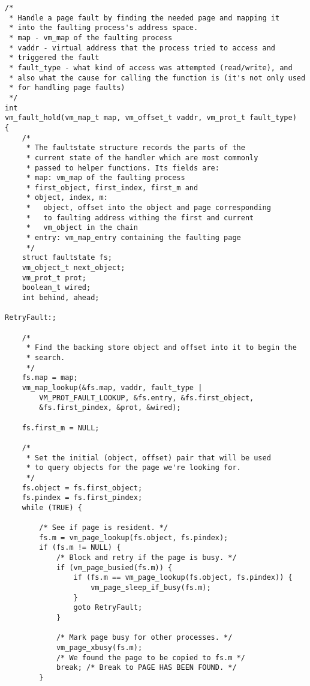 \documentclass[shortabstract, english]{iithesis}
\newenvironment{code}{}{}
\begin{document}
\begin{code}
\begin{verbatim}
/*
 * Handle a page fault by finding the needed page and mapping it
 * into the faulting process's address space.
 * map - vm_map of the faulting process
 * vaddr - virtual address that the process tried to access and
 * triggered the fault
 * fault_type - what kind of access was attempted (read/write), and
 * also what the cause for calling the function is (it's not only used
 * for handling page faults)
 */
int
vm_fault_hold(vm_map_t map, vm_offset_t vaddr, vm_prot_t fault_type)
{
    /*
     * The faultstate structure records the parts of the
     * current state of the handler which are most commonly
     * passed to helper functions. Its fields are:
     * map: vm_map of the faulting process
     * first_object, first_index, first_m and
     * object, index, m:
     *   object, offset into the object and page corresponding
     *   to faulting address withing the first and current
     *   vm_object in the chain
     * entry: vm_map_entry containing the faulting page
     */
    struct faultstate fs;
    vm_object_t next_object;
    vm_prot_t prot;
    boolean_t wired;
    int behind, ahead;

RetryFault:;

    /*
     * Find the backing store object and offset into it to begin the
     * search.
     */
    fs.map = map;
    vm_map_lookup(&fs.map, vaddr, fault_type |
        VM_PROT_FAULT_LOOKUP, &fs.entry, &fs.first_object,
        &fs.first_pindex, &prot, &wired);

    fs.first_m = NULL;

    /*
     * Set the initial (object, offset) pair that will be used
     * to query objects for the page we're looking for.
     */
    fs.object = fs.first_object;
    fs.pindex = fs.first_pindex;
    while (TRUE) {

        /* See if page is resident. */
        fs.m = vm_page_lookup(fs.object, fs.pindex);
        if (fs.m != NULL) {
            /* Block and retry if the page is busy. */
            if (vm_page_busied(fs.m)) {
                if (fs.m == vm_page_lookup(fs.object, fs.pindex)) {
                    vm_page_sleep_if_busy(fs.m);
                }
                goto RetryFault;
            }

            /* Mark page busy for other processes. */
            vm_page_xbusy(fs.m);
            /* We found the page to be copied to fs.m */
            break; /* Break to PAGE HAS BEEN FOUND. */
        }


\end{verbatim}
\end{code}
\end{document}

